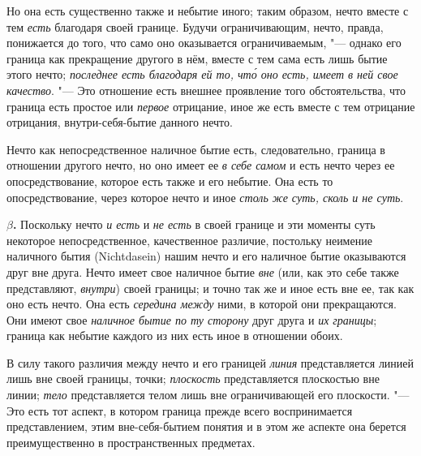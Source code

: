Но она есть существенно также и небытие иного; таким образом, нечто вместе
с тем {\em есть} благодаря своей границе. Будучи
ограничивающим, нечто, правда, понижается до того, что само оно оказывается
ограничиваемым, "--- однако его граница как прекращение другого в нём, вместе
с тем сама есть лишь бытие этого нечто; {\em последнее
есть благодаря ей то, чт\'{о} оно есть, имеет в ней
свое качество}. "--- Это отношение есть внешнее проявление того
обстоятельства, что граница есть простое или
{\em первое} отрицание, иное же есть вместе с тем
отрицание отрицания, внутри-себя-бытие данного нечто.

Нечто как непосредственное наличное бытие есть, следовательно, граница в
отношении другого нечто, но оно имеет ее {\em в себе
самом} и есть нечто через ее опосредствование, которое есть также и его
небытие. Она есть то опосредствование, через которое нечто и иное
{\em столь же суть, сколь и не суть}.

{\bfseries $\beta $.} Поскольку нечто {\em и есть} и
{\em не есть} в своей границе и эти моменты суть
некоторое непосредственное, качественное различие, постольку неимение
наличного бытия (Nicht\-dasein) нашим нечто и его наличное бытие оказываются
друг вне друга. Нечто имеет свое наличное бытие
{\em вне} (или, как это себе также представляют,
{\em внутри}) своей границы; и точно так же и иное
есть вне ее, так как оно есть нечто. Она есть
{\em середина между} ними, в которой они прекращаются.
Они имеют свое {\em наличное бытие по ту сторону} друг
друга и {\em их границы}; граница как небытие каждого
из них есть иное в отношении обоих.

В силу такого различия между нечто и его границей
{\em линия} представляется линией лишь вне своей
границы, точки; {\em плоскость} представляется
плоскостью вне линии; {\em тело} представляется телом
лишь вне ограничивающей его плоскости. "--- Это есть тот аспект, в котором
граница прежде всего воспринимается представлением, этим вне-себя-бытием
понятия и в этом же аспекте она берется преимущественно в пространственных
предметах.

